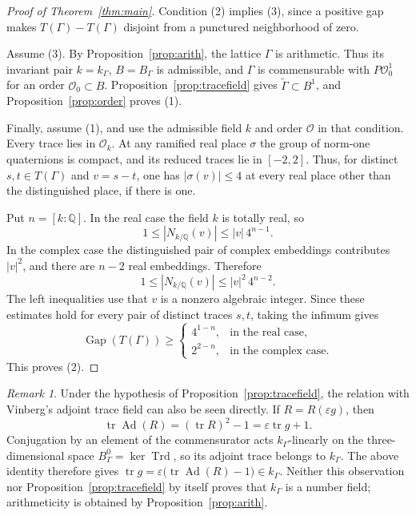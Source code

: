 \documentclass[reqno]{amsart}
\theoremstyle{remark}
\newtheorem{remark}[theorem]{Remark}
\DeclareMathOperator{\tr}{tr}
\DeclareMathOperator{\Ad}{Ad}
\DeclareMathOperator{\Trd}{Trd}
\DeclareMathOperator{\Gap}{Gap}
\newcommand{\Q}{\mathbb Q}
\newcommand{\G}{\widetilde\Gamma}
\newcommand{\OO}{\mathcal O}
\begin{document}
\begin{proof}[Proof of Theorem~\ref{thm:main}]
Condition (2) implies (3), since a positive gap makes $T(\Gamma)-T(\Gamma)$ disjoint from a punctured neighborhood of zero.

Assume (3). By Proposition~\ref{prop:arith}, the lattice $\Gamma$ is arithmetic. Thus its invariant pair $k=k_\Gamma$, $B=B_\Gamma$ is admissible, and $\Gamma$ is commensurable with $P\OO_0^1$ for an order $\OO_0\subset B$. Proposition~\ref{prop:tracefield} gives $\G\subset B^1$, and Proposition~\ref{prop:order} proves (1).

Finally, assume (1), and use the admissible field $k$ and order $\OO$ in that condition. Every trace lies in $\OO_k$. At any ramified real place $\sigma$ the group of norm-one quaternions is compact, and its reduced traces lie in $[-2,2]$. Thus, for distinct $s,t\in T(\Gamma)$ and $v=s-t$, one has $|\sigma(v)|\le4$ at every real place other than the distinguished place, if there is one.

Put $n=[k:\Q]$. In the real case the field $k$ is totally real, so
$$
1\le|N_{k/\Q}(v)|\le |v|\,4^{n-1}.
$$
In the complex case the distinguished pair of complex embeddings contributes $|v|^2$, and there are $n-2$ real embeddings. Therefore
$$
1\le|N_{k/\Q}(v)|\le |v|^2\,4^{n-2}.
$$
The left inequalities use that $v$ is a nonzero algebraic integer. Since
these estimates hold for every pair of distinct traces $s,t$, taking the
infimum gives
$$
\Gap(T(\Gamma))\ge
\begin{cases}
4^{1-n},&\text{in the real case},\\
2^{2-n},&\text{in the complex case}.
\end{cases}
$$
This proves (2).
\end{proof}

\begin{remark}
Under the hypothesis of Proposition~\ref{prop:tracefield}, the relation with Vinberg's adjoint trace field can also be seen directly. If $R=R(\varepsilon g)$, then
$$
\tr\Ad(R)=(\tr R)^2-1=\varepsilon\tr g+1.
$$
Conjugation by an element of the commensurator acts $k_\Gamma$-linearly on the three-dimensional space $B_\Gamma^0=\ker\Trd$, so its adjoint trace belongs to $k_\Gamma$. The above identity therefore gives $\tr g=\varepsilon\bigl(\tr\Ad(R)-1\bigr)\in k_\Gamma$. Neither this observation nor Proposition~\ref{prop:tracefield} by itself proves that $k_\Gamma$ is a number field; arithmeticity is obtained by Proposition~\ref{prop:arith}.
\end{remark}
\end{document}
